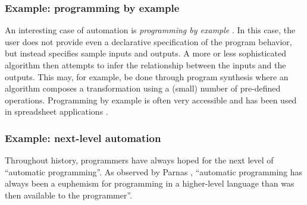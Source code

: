 \documentclass[english,submission]{programming}
\providecommand{\DIFaddend}{} %
\begin{document}
\DIFaddend \hypertarget{example-programming-by-example}{%
\subsubsection{Example: programming by
example}\label{example-programming-by-example}}

An interesting case of automation is \emph{programming by example}
\cite{PBE}. In this case, the user does not provide even a declarative
specification of the program behavior, but instead specifies sample
inputs and outputs. A more or less sophisticated algorithm then attempts
to infer the relationship between the inputs and the outputs. This may,
for example, be done through program synthesis where an algorithm
composes a transformation using a (small) number of pre-defined
operations. Programming by example is often very accessible and has been
used in spreadsheet applications \cite{PBEExcel}.


\hypertarget{example-next-level-automation}{%
\subsubsection{Example: next-level
automation}\label{example-next-level-automation}}

Throughout history, programmers have always hoped for the next level of
``automatic programming''. As observed by Parnas \cite{Euphemism},
``automatic programming has always been a euphemism for programming in a
higher-level language than was then available to the programmer''.
\end{document}
